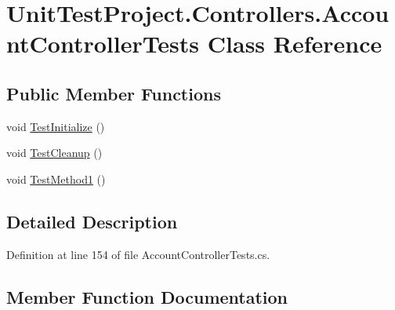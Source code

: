\hypertarget{class_unit_test_project_1_1_controllers_1_1_account_controller_tests}{}\section{Unit\+Test\+Project.\+Controllers.\+Account\+Controller\+Tests Class Reference}
\label{class_unit_test_project_1_1_controllers_1_1_account_controller_tests}
\subsection*{Public Member Functions}
\begin{DoxyCompactItemize}
\item 
void \mbox{\hyperlink{class_unit_test_project_1_1_controllers_1_1_account_controller_tests_af7ed4e05e1d42d71c6dcf79f5c602fb7}{Test\+Initialize}} ()
\item 
void \mbox{\hyperlink{class_unit_test_project_1_1_controllers_1_1_account_controller_tests_a545e6df98a8069323038255c48f0c38e}{Test\+Cleanup}} ()
\item 
void \mbox{\hyperlink{class_unit_test_project_1_1_controllers_1_1_account_controller_tests_a20c025673b5cf0584b3e23fa715fb588}{Test\+Method1}} ()
\end{DoxyCompactItemize}


\subsection{Detailed Description}


Definition at line 154 of file Account\+Controller\+Tests.\+cs.



\subsection{Member Function Documentation}
\mbox{\label{class_unit_test_project_1_1_controllers_1_1_account_controller_tests_a545e6df98a8069323038255c48f0c38e}} 
